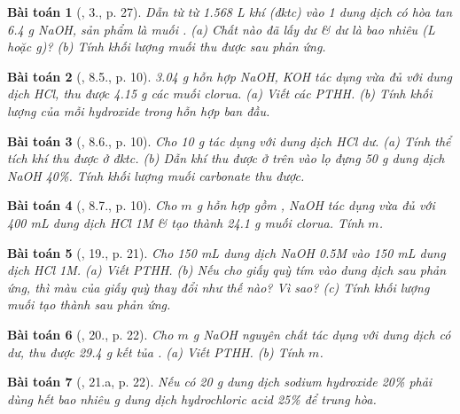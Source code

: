 \documentclass{article}
\newtheorem{baitoan}{Bài toán}
\begin{document}
\begin{baitoan}[\cite{SGK_Hoa_Hoc_9}, 3., p. 27]
	Dẫn từ từ \emph{1.568 L} khí \emph{} (đktc) vào 1 dung dịch có hòa tan \emph{6.4 g NaOH}, sản phẩm là muối \emph{}. (a) Chất nào đã lấy dư \& dư là bao nhiêu (\emph{L} hoặc \emph{g})? (b) Tính khối lượng muối thu được sau phản ứng.
\end{baitoan}

\begin{baitoan}[\cite{SGK_Hoa_Hoc_9}, 8.5., p. 10]
	\emph{3.04 g} hỗn hợp \emph{NaOH, KOH} tác dụng vừa đủ với dung dịch \emph{HCl}, thu được \emph{4.15 g} các muối clorua. (a) Viết các PTHH. (b) Tính khối lượng của mỗi hydroxide trong hỗn hợp ban đầu.
\end{baitoan}

\begin{baitoan}[\cite{SGK_Hoa_Hoc_9}, 8.6., p. 10]
	Cho \emph{10 g } tác dụng với dung dịch \emph{HCl} dư. (a) Tính thể tích khí \emph{} thu được ở đktc. (b) Dẫn khí \emph{} thu được ở trên vào lọ đựng \emph{50 g} dung dịch \emph{NaOH 40\%}. Tính khối lượng muối carbonate thu được.
\end{baitoan}

\begin{baitoan}[\cite{SGK_Hoa_Hoc_9}, 8.7., p. 10]
	Cho $m$ \emph{g} hỗn hợp gồm \emph{, NaOH} tác dụng vừa đủ với \emph{400 mL} dung dịch \emph{HCl 1M} \& tạo thành \emph{24.1 g} muối clorua. Tính $m$.
\end{baitoan}

\begin{baitoan}[\cite{An_350_BT_Hoa_Hoc_9}, 19., p. 21]
	Cho \emph{150 mL} dung dịch \emph{NaOH 0.5M} vào \emph{150 mL} dung dịch \emph{HCl 1M}. (a) Viết PTHH. (b) Nếu cho giấy quỳ tím vào dung dịch sau phản ứng, thì màu của giấy quỳ thay đổi như thế nào? Vì sao? (c) Tính khối lượng muối tạo thành sau phản ứng.
\end{baitoan}

\begin{baitoan}[\cite{An_350_BT_Hoa_Hoc_9}, 20., p. 22]
	Cho $m$ \emph{g NaOH} nguyên chất tác dụng với dung dịch \emph{} có dư, thu được \emph{29.4 g} kết tủa \emph{}. (a) Viết PTHH. (b) Tính $m$.
\end{baitoan}

\begin{baitoan}[\cite{An_350_BT_Hoa_Hoc_9}, 21.a, p. 22]
	Nếu có \emph{20 g} dung dịch sodium hydroxide \emph{20\%} phải dùng hết bao nhiêu \emph{g} dung dịch hydrochloric acid \emph{25\%} để trung hòa.
\end{baitoan}
\end{document}
